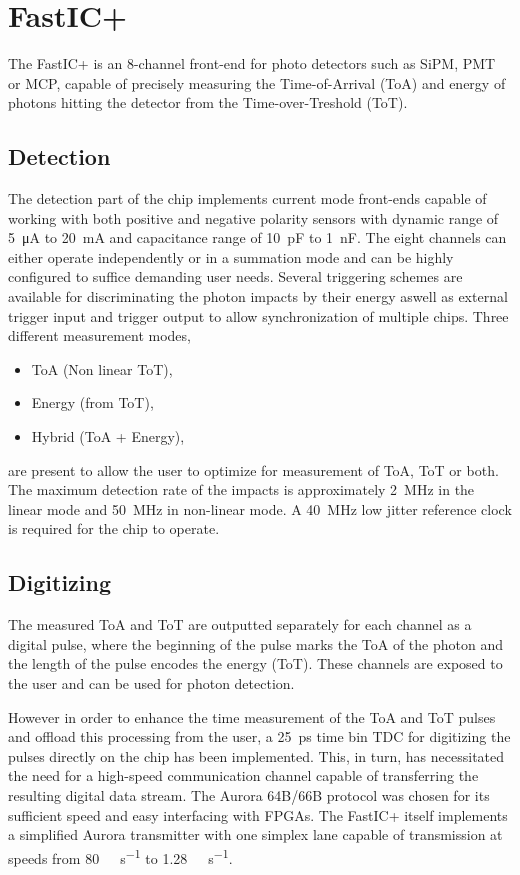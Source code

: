 \chapter{FastIC+}
The FastIC+ is an 8-channel front-end for photo detectors such as SiPM, PMT or MCP, capable of precisely
measuring the Time-of-Arrival (ToA) and energy of photons hitting the detector from the Time-over-Treshold (ToT). 

\section{Detection}
\label{sec:fastic:detection}
The detection part of the chip implements current mode front-ends capable of working with both positive and negative polarity sensors with dynamic range of \SI{5}{\micro\ampere} to \SI{20}{\milli\ampere} and capacitance range of \SI{10}{\pico\farad} to \SI{1}{\nano\farad}. The eight channels can either operate independently or in a summation mode and can be highly configured to suffice demanding user needs. Several triggering schemes are available for discriminating the photon impacts by their energy aswell as external trigger input and trigger output to allow synchronization of multiple chips. Three different measurement modes, 
\begin{itemize}
    \item ToA (Non linear ToT),
    \item Energy (from ToT),
    \item Hybrid (ToA + Energy),
\end{itemize}
are present to allow the user to optimize for measurement of ToA, ToT or both. The maximum detection rate of the impacts is approximately \SI{2}{\mega\hertz} in the linear mode and \SI{50}{\mega\hertz} in non-linear mode. A \SI{40}{\mega\hertz} low jitter reference clock is required for the chip to operate.


\section{Digitizing}
The measured ToA and ToT are outputted separately for each channel as a digital pulse, where the beginning of the pulse marks the ToA of the photon and the length of the pulse encodes the energy (ToT). These channels are exposed to the user and can be used for photon detection.

However in order to enhance the time measurement of the ToA and ToT pulses and offload this processing from the user, a \SI{25}{\pico\second} time bin TDC for digitizing the pulses directly on the chip has been implemented. This, in turn, has necessitated the need for a high-speed communication channel capable of transferring the resulting digital data stream. The Aurora 64B/66B protocol was chosen for its sufficient speed and easy interfacing with FPGAs. The FastIC+ itself implements a simplified Aurora transmitter with one simplex lane capable of transmission at speeds from \SI{80}{\mega\bit\per\second} to \SI{1.28}{\giga\bit\per\second}.

